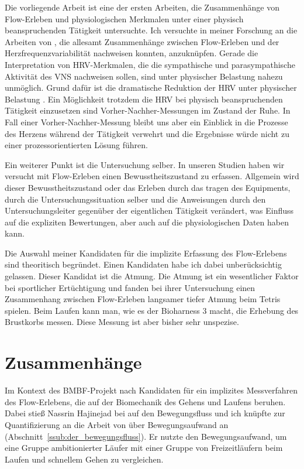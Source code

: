 Die vorliegende Arbeit ist eine der ersten Arbeiten, die Zusammenhänge von Flow-Erleben und physiologischen Merkmalen unter einer physisch beanspruchenden Tätigkeit untersuchte. Ich versuchte in meiner Forschung an die Arbeiten von \citet{deManzano2010, Keller2011, Gaggioli2013, Peifer2014, Tozman2015}, die allesamt Zusammenhänge zwischen Flow-Erleben und der Herzfrequenzvariabilität nachweisen konnten, anzuknüpfen. Gerade die Interpretation von \ac{HRV}-Merkmalen, die die sympathische und parasympathische Aktivität des \acs{VNS} nachweisen sollen, sind unter physischer Belastung nahezu unmöglich. Grund dafür ist die dramatische Reduktion der \ac{HRV} unter physischer Belastung \citep{Hoos2010}. Ein Möglichkeit trotzdem die \ac{HRV} bei physisch beanspruchenden Tätigkeit einzusetzen sind Vorher-Nachher-Messungen im Zustand der Ruhe. In Fall einer Vorher-Nachher-Messung bleibt uns aber ein Einblick in die Prozesse des Herzens während der Tätigkeit verwehrt und die Ergebnisse würde nicht zu einer prozessorientierten Lösung führen. 

Ein weiterer Punkt ist die Untersuchung selber. In unseren Studien haben wir versucht mit Flow-Erleben einen Bewusstheitszustand zu erfassen. Allgemein wird dieser Bewusstheitszustand oder das Erleben durch das tragen des Equipments, durch die Untersuchungssituation selber und die Anweisungen durch den Untersuchungsleiter gegenüber der eigentlichen Tätigkeit verändert, was Einfluss auf die expliziten Bewertungen, aber auch auf die physiologischen Daten haben kann.

Die Auswahl meiner Kandidaten für die implizite Erfassung des Flow-Erlebens sind theoritisch begründet. Einen Kandidaten habe ich dabei unberücksichtig gelassen. Dieser Kandidat ist die Atmung. Die Atmung ist ein wesentlicher Faktor bei sportlicher Ertüchtigung und \citet{Harmat2015} fanden bei ihrer Untersuchung einen Zusammenhang zwischen Flow-Erleben langsamer tiefer Atmung beim Tetris spielen. Beim Laufen kann man, wie es der Bioharness 3 macht, die Erhebung des Brustkorbs messen. Diese Messung ist aber bisher sehr unspezise. 

\section{Zusammenhänge} 

\label{sec:zusammenhange}

Im Kontext des \acs{BMBF}-Projekt nach Kandidaten für ein implizites Messverfahren des Flow-Erlebens, die auf der Biomechanik des Gehens und Laufens beruhen. Dabei stieß Nassrin Hajinejad bei \citet[][S.~121]{Meinel2007} auf den Bewegungsfluss und ich knüpfte zur Quantifizierung an die Arbeit von \citet{Hreljac2000} über Bewegungsaufwand an (Abschnitt~\ref{ssub:der_bewegungsfluss}). Er nutzte den Bewegungsaufwand, um eine Gruppe ambitionierter Läufer mit einer Gruppe von Freizeitläufern beim Laufen und schnellem Gehen zu vergleichen. 

